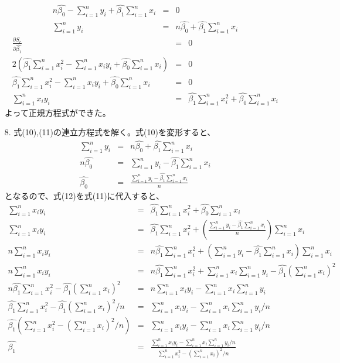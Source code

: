 \documentclass[12pt]{jarticle}
\begin{document}
\begin{itemize}
\begin{eqnarray}
              n\hat{\beta_0}-\sum_{i=1}^{n}y_i+\hat{\beta_1}\sum_{i=1}^{n}x_i &=&0 \nonumber \\
              \sum_{i=1}^{n}y_i&=&n\hat{\beta_0}+\hat{\beta_1}\sum_{i=1}^{n}x_i
          \end{eqnarray}
          \begin{eqnarray}
              \frac{\partial S_e}{\partial \hat{\beta_1}}&=&0 \nonumber \\
              2(\hat{\beta_1}\sum_{i=1}^{n}x_i^2-\sum_{i=1}^{n} x_iy_i+\hat{\beta_0}\sum_{i=1}^{n} x_i) &=&0 \nonumber \\
              \hat{\beta_1}\sum_{i=1}^{n}x_i^2-\sum_{i=1}^{n} x_iy_i+\hat{\beta_0}\sum_{i=1}^{n} x_i &=&0 \nonumber \\
              \sum_{i=1}^{n} x_iy_i &=&\hat{\beta_1}\sum_{i=1}^{n}x_i^2+\hat{\beta_0}\sum_{i=1}^{n} x_i
          \end{eqnarray}
          よって正規方程式ができた。
    \item [8.]式(10),(11)の連立方程式を解く。式(10)を変形すると、
          \begin{eqnarray}
              \sum_{i=1}^{n}y_i&=&n\hat{\beta_0}+\hat{\beta_1}\sum_{i=1}^{n}x_i \nonumber \\
              n\hat{\beta_0}&=& \sum_{i=1}^{n}y_i-\hat{\beta_1}\sum_{i=1}^{n}x_i \nonumber \\
              \hat{\beta_0}&=& \frac{\sum_{i=1}^{n}y_i-\hat{\beta_1}\sum_{i=1}^{n}x_i}{n}
          \end{eqnarray}
          となるので、式(12)を式(11)に代入すると、
          \begin{eqnarray}
              \sum_{i=1}^{n} x_iy_i &=&\hat{\beta_1}\sum_{i=1}^{n}x_i^2+\hat{\beta_0}\sum_{i=1}^{n} x_i \nonumber \\
              \sum_{i=1}^{n} x_iy_i &=&\hat{\beta_1}\sum_{i=1}^{n}x_i^2+ (\frac{\sum_{i=1}^{n}y_i-\hat{\beta_1}\sum_{i=1}^{n}x_i}{n})\sum_{i=1}^{n} x_i \nonumber \\
              n\sum_{i=1}^{n} x_iy_i &=&n\hat{\beta_1}\sum_{i=1}^{n}x_i^2+ (\sum_{i=1}^{n}y_i-\hat{\beta_1}\sum_{i=1}^{n}x_i)\sum_{i=1}^{n} x_i \nonumber \\
              n\sum_{i=1}^{n} x_iy_i &=&n\hat{\beta_1}\sum_{i=1}^{n}x_i^2+ \sum_{i=1}^{n} x_i\sum_{i=1}^{n}y_i-\hat{\beta_1}(\sum_{i=1}^{n}x_i)^2 \nonumber \\
              n\hat{\beta_1}\sum_{i=1}^{n}x_i^2-\hat{\beta_1}(\sum_{i=1}^{n}x_i)^2   &=&  n\sum_{i=1}^{n} x_iy_i-\sum_{i=1}^{n} x_i\sum_{i=1}^{n}y_i \nonumber \\
              \hat{\beta_1}\sum_{i=1}^{n}x_i^2-\hat{\beta_1}(\sum_{i=1}^{n}x_i)^2/n   &=&  \sum_{i=1}^{n} x_iy_i-\sum_{i=1}^{n} x_i\sum_{i=1}^{n}y_i/n \nonumber \\
              \hat{\beta_1}(\sum_{i=1}^{n}x_i^2-(\sum_{i=1}^{n}x_i)^2/n)   &=&  \sum_{i=1}^{n} x_iy_i-\sum_{i=1}^{n} x_i\sum_{i=1}^{n}y_i/n \nonumber \\
              \hat{\beta_1} &=&  \frac{\sum_{i=1}^{n} x_iy_i-\sum_{i=1}^{n} x_i\sum_{i=1}^{n}y_i/n}{\sum_{i=1}^{n}x_i^2-(\sum_{i=1}^{n}x_i)^2/n}
          \end{eqnarray}


\end{itemize}
\end{document}
